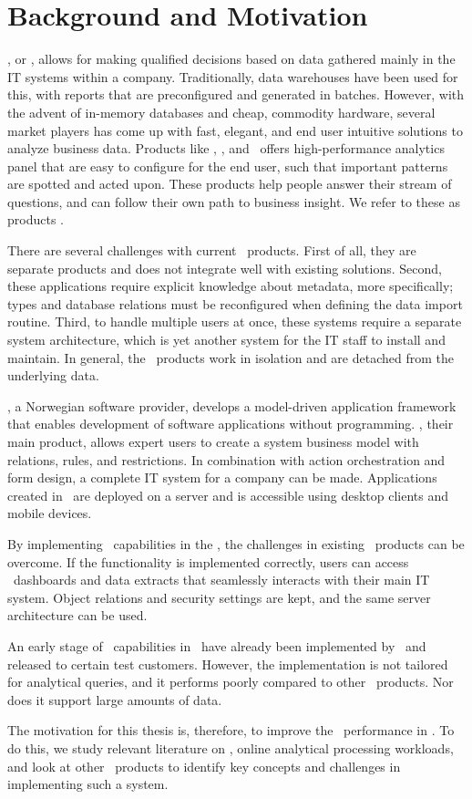 \section{Background and Motivation}
\label{sec:Background and Motivation}

\bi, or \ba, allows for making qualified decisions based on data gathered mainly in the IT systems within a company. Traditionally, data warehouses have been used for this, with reports that are preconfigured and generated in batches. However, with the advent of in-memory databases and cheap, commodity hardware, several market players has come up with fast, elegant, and end user intuitive solutions to analyze business data. Products like \qlikview, \tableau, and \powerpivot~offers high-performance analytics panel that are easy to configure for the end user, such that important patterns are spotted and acted upon. These products help people answer their stream of questions, and can follow their own path to business insight. We refer to these as  products \cite{Qlik2014-vd}.

There are several challenges with current \bd~products. First of all, they are separate products and does not integrate well with existing solutions. Second, these applications require explicit knowledge about metadata, more specifically; types and database relations must be reconfigured when defining the data import routine.  Third, to handle multiple users at once, these systems require a separate system architecture, which is yet another system for the IT staff to install and maintain. In general, the \bd~products work in isolation and are detached from the underlying data.

\genus, a Norwegian software provider, develops a model-driven application framework that enables development of software applications without programming. \genusSoftware, their main product, allows expert users to create a system business model with relations, rules, and restrictions. In combination with action orchestration and form design, a complete IT system for a company can be made. Applications created in \genusSoftware~are deployed on a server and is accessible using desktop clients and mobile devices.

By implementing \bd~capabilities in the \genusSoftware, the challenges in existing \bd~products can be overcome. If the functionality is implemented correctly, users can access \bd~dashboards and data extracts that seamlessly interacts with their main IT system. Object relations and security settings are kept, and the same server architecture can be used. 

An early stage of \bd~capabilities in \genusSoftware~have already been implemented by \genus~and released to certain test customers. However, the implementation is not tailored for analytical queries, and it performs poorly compared to other \bd~products. Nor does it support large amounts of data. 

The motivation for this thesis is, therefore, to improve the \bd~performance in \genusSoftware. To do this, we study relevant literature on \bi, online analytical processing workloads, and look at other \bd~products to identify key concepts and challenges in implementing such a system. 
